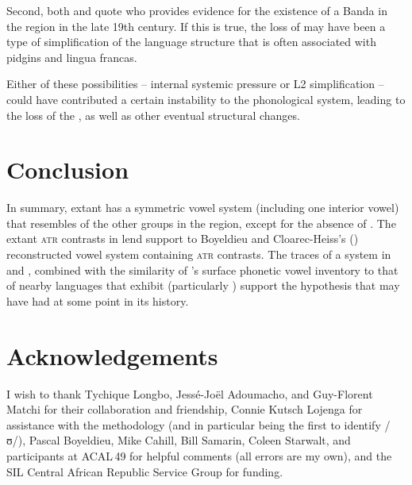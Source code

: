 \documentclass[output=paper,colorlinks,citecolor=brown]{langscibook}
\begin{document}
Second, both \citet{Samarin1982} and \citet{Cloarec-Heiss1995} quote \citet[205--206]{Brunache1894} who provides evidence for the existence of a Banda   in the region in the late 19th century. If this is true, the loss of  may have been a type of simplification of the language structure that is often associated with pidgins  and  lingua francas.

Either of these possibilities -- internal systemic pressure or L2 simplification -- could have contributed a certain instability to the phonological system, leading to the loss of the , as well as other eventual structural changes.

\section{Conclusion}\label{sec:olson:5}

In summary, extant  has a symmetric  vowel system  (including one interior vowel) that resembles  of the other groups in the region, except for the absence of . The extant \textsc{atr} contrasts in  lend support to Boyeldieu and Cloarec-Heiss’s (\citeyear{BoyeldieuCloarec-Heiss2001}) reconstructed  vowel system  containing \textsc{atr} contrasts. The traces of a  system in  and , combined with the similarity of ’s surface phonetic vowel inventory to that of nearby languages that exhibit  (particularly ) support the hypothesis that  may have had  at some point in its history.

\section*{Acknowledgements}

I wish to thank Tychique Longbo, Jessé-Joël Adoumacho, and Guy-Florent Matchi for their collaboration and friendship, Connie Kutsch Lojenga for assistance with the methodology (and in particular being the first to identify /ʊ/), Pascal Boyeldieu, Mike Cahill, Bill Samarin, Coleen Starwalt, and participants at ACAL\,49 for helpful comments (all errors are my own), and the SIL Central African Republic Service Group for funding.

{\sloppy\printbibliography[heading=subbibliography,notkeyword=this]}
\end{document}
